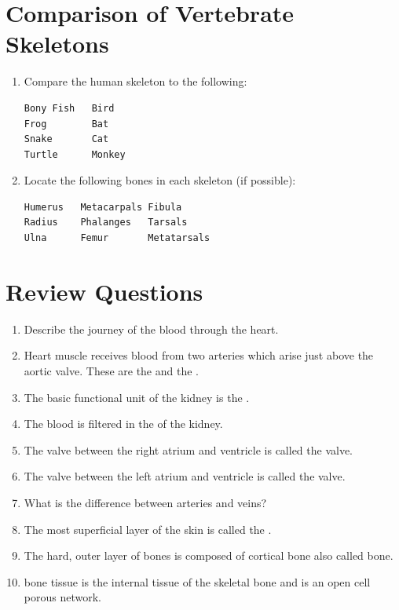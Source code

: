 \documentclass[]{book}
\providecommand{\tightlist}{%
  \setlength{\itemsep}{0pt}\setlength{\parskip}{0pt}}
\theoremstyle{definition}
\theoremstyle{definition}
\theoremstyle{definition}
\theoremstyle{remark}
\begin{document}
\section{Comparison of Vertebrate
Skeletons}\label{comparison-of-vertebrate-skeletons}

\begin{enumerate}
\def\labelenumi{\arabic{enumi}.}
\item
  Compare the human skeleton to the following:

\begin{verbatim}
Bony Fish   Bird
Frog        Bat
Snake       Cat
Turtle      Monkey
\end{verbatim}
\item
  Locate the following bones in each skeleton (if possible):

\begin{verbatim}
Humerus   Metacarpals Fibula
Radius    Phalanges   Tarsals
Ulna      Femur       Metatarsals
\end{verbatim}
\end{enumerate}

\section{Review Questions}\label{review-questions-9}

\begin{enumerate}
\def\labelenumi{\arabic{enumi}.}
\tightlist
\item
  Describe the journey of the blood through the heart.
\item
  Heart muscle receives blood from two arteries which arise just above
  the aortic valve. These are the \underline{\phantom{answer}} and the
  \underline{\phantom{answer}}.
\item
  The basic functional unit of the kidney is the
  \underline{\phantom{answer}}.
\item
  The blood is filtered in the \underline{\phantom{answer}} of the kidney.
\item
  The valve between the right atrium and ventricle is called the
  \underline{\phantom{answer}} valve.
\item
  The valve between the left atrium and ventricle is called the
  \underline{\phantom{answer}} valve.
\item
  What is the difference between arteries and veins?
\item
  The most superficial layer of the skin is called the
\underline{\phantom{answer}}.
\item
  The hard, outer layer of bones is composed of cortical bone also
  called \underline{\phantom{answer}} bone.
\item
  \underline{\phantom{answer}} bone tissue is the internal tissue of the
  skeletal bone and is an open cell porous network.  
\end{enumerate}
\end{document}
